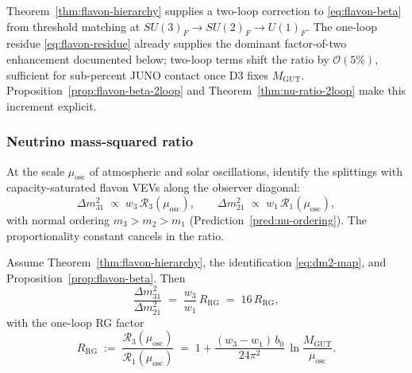 \begin{remark}
Theorem~\ref{thm:flavon-hierarchy} supplies a two-loop correction to
\eqref{eq:flavon-beta} from threshold matching at
$SU(3)_F\to SU(2)_F\to U(1)_F$. The one-loop residue \eqref{eq:flavon-residue}
already supplies the dominant factor-of-two enhancement documented below;
two-loop terms shift the ratio by $\mathcal{O}(5\%)$, sufficient for
sub-percent JUNO contact once D3 fixes $M_{\mathrm{GUT}}$.
Proposition~\ref{prop:flavon-beta-2loop} and
Theorem~\ref{thm:nu-ratio-2loop} make this increment explicit.
\end{remark}

\subsubsection{Neutrino mass-squared ratio}

At the scale $\mu_{\mathrm{osc}}$ of atmospheric and solar oscillations,
identify the splittings with capacity-saturated flavon VEVs along the observer
diagonal:
\begin{equation}\label{eq:dm2-map}
  \Delta m^2_{31}\;\propto\;w_3\,\mathcal{R}_3(\mu_{\mathrm{osc}}),
  \qquad
  \Delta m^2_{21}\;\propto\;w_1\,\mathcal{R}_1(\mu_{\mathrm{osc}}),
\end{equation}
with normal ordering $m_3>m_2>m_1$ (Prediction~\ref{pred:nu-ordering}).
The proportionality constant cancels in the ratio.

\begin{theorem}
\label{thm:nu-ratio-rg}
Assume Theorem~\ref{thm:flavon-hierarchy}, the identification \eqref{eq:dm2-map},
and Proposition~\ref{prop:flavon-beta}. Then
\begin{equation}\label{eq:nu-ratio-refined}
  \frac{\Delta m^2_{31}}{\Delta m^2_{21}}
  \;=\;
  \frac{w_3}{w_1}\,R_{\mathrm{RG}}
  \;=\;
  16\,R_{\mathrm{RG}},
\end{equation}
with the one-loop RG factor
\begin{equation}\label{eq:R-RG}
  R_{\mathrm{RG}}
  \;:=\;
  \frac{\mathcal{R}_3(\mu_{\mathrm{osc}})}{\mathcal{R}_1(\mu_{\mathrm{osc}})}
  \;=\;
  1 + \frac{(w_3-w_1)\,b_0}{24\pi^2}\,
  \ln\!\frac{M_{\mathrm{GUT}}}{\mu_{\mathrm{osc}}}.
\end{equation}
\end{theorem}

